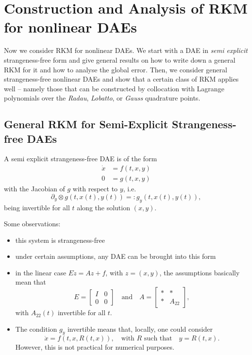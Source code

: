 \documentclass[]{book}
\providecommand{\tightlist}{%
  \setlength{\itemsep}{0pt}\setlength{\parskip}{0pt}}
\theoremstyle{definition}
\theoremstyle{definition}
\theoremstyle{definition}
\theoremstyle{definition}
\theoremstyle{remark}
\begin{document}
\hypertarget{construction-and-analysis-of-rkm-for-nonlinear-daes}{%
\chapter{Construction and Analysis of RKM for nonlinear DAEs}\label{construction-and-analysis-of-rkm-for-nonlinear-daes}}

Now we consider RKM for nonlinear DAEs. We start with a DAE in \emph{semi explicit} strangeness-free form and give general results on how to write down a general RKM for it and how to analyse the global error. Then, we consider general strangeness-free nonlinear DAEs and show that a certain class of RKM applies well -- namely those that can be constructed by collocation with Lagrange polynomials over the \emph{Radau}, \emph{Lobatto}, or \emph{Gauss} quadrature points.

\hypertarget{general-rkm-for-semi-explicit-strangeness-free-daes}{%
\section{General RKM for Semi-Explicit Strangeness-free DAEs}\label{general-rkm-for-semi-explicit-strangeness-free-daes}}

A semi explicit strangeness-free DAE is of the form
\begin{align}
\dot x &= f(t, x, y) \label{eq:semexp-dae-diff} \\
0 &= g(t, x, y) \label{eq:semexp-dae-alg}
\end{align}
with the Jacobian of \(g\) with respect to \(y\), i.e.
\[
\partial_y\otimes g(t, x(t), y(t)) =: g_y(t, x(t), y(t)),
\]
being invertible for all \(t\) along the solution \((x,y)\).

Some observations:

\begin{itemize}
\tightlist
\item
  this system is strangeness-free
\item
  under certain assumptions, any DAE can be brought into this form
\item
  in the linear case \(E\dot z = Az +f\), with \(z=(x,y)\), the assumptions basically mean that
  \[
   E = \begin{bmatrix} I & 0 \\ 0 & 0 \end{bmatrix} \quad\text{and}\quad 
   A = \begin{bmatrix} * & * \\ * & A_{22} \end{bmatrix},
  \]
  with \(A_{22}(t)\) invertible for all \(t\).
\item
  The condition \(g_y\) invertible means that, locally, one could consider
  \[
   \dot x = f(t, x, R(t,x)), \quad\text{with $R$ such that}\quad y=R(t,x).
  \]
  However, this is not practical for numerical purposes.
\end{itemize}
\end{document}
